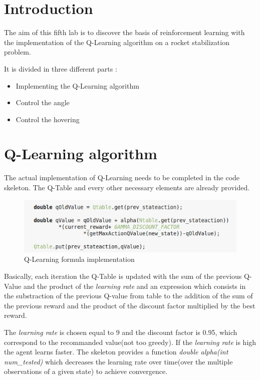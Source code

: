 \section*{Introduction} \thispagestyle{empty}

The aim of this fifth lab is to discover the basis of reinforcement
learning with the implementation of the Q-Learning algorithm on a rocket
stabilization problem.

It is divided in three different parts : \begin{itemize} \item Implementing
the Q-Learning algorithm \item Control the angle \item Control the hovering
\end{itemize}

\section*{Q-Learning algorithm}

The actual implementation of Q-Learning needs to be completed in the 
code skeleton. The Q-Table and every other necessary elements are
already provided.


\begin{figure}[h] \centering \includegraphics[width=.89\linewidth,
scale=1.5]{./images/1.png} \caption{Q-Learning formula implementation}
\end{figure} 

Basically, each iteration the Q-Table is updated with the sum of the
previous Q-Value and the product of the \textit{learning rate} and
an expression which consists in the substraction of the previous Q-value
from table to the addition of the sum of the previous reward and the
product of the discount factor multiplied by the best reward.

The \textit{learning rate} is chosen equal to 9 and the discount factor 
is 0.95, which correspond to the recommanded value(not too greedy). If the
\textit{learning rate} is high the agent learns faster. The skeleton
provides a function \textit{double alpha(int num\_tested)} which decreases 
the learning rate over time(over the multiple observations of a given
state) to achieve convergence. 

